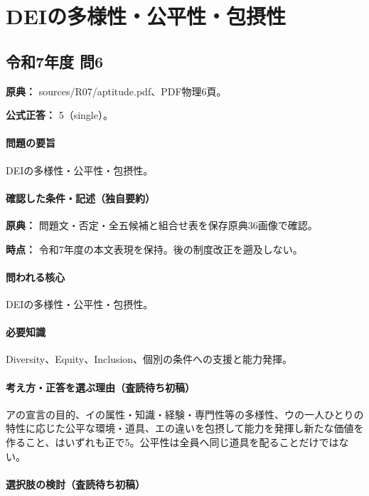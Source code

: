 \section{DEIの多様性・公平性・包摂性}

\subsection{令和7年度 問6}
\label{q:r07-reg-apt-06}

\noindent\textbf{原典：} sources/R07/aptitude.pdf、PDF物理6頁。

\textbf{公式正答：} 5（single）。

\paragraph{問題の要旨} DEIの多様性・公平性・包摂性。

\paragraph{確認した条件・記述（独自要約）}\mbox{}\par

\noindent\textbf{原典：} 問題文・否定・全五候補と組合せ表を保存原典36画像で確認。\par

\noindent\textbf{時点：} 令和7年度の本文表現を保持。後の制度改正を遡及しない。\par

\paragraph{問われる核心} DEIの多様性・公平性・包摂性。

\paragraph{必要知識} Diversity、Equity、Inclusion、個別の条件への支援と能力発揮。

\paragraph{考え方・正答を選ぶ理由（査読待ち初稿）} アの宣言の目的、イの属性・知識・経験・専門性等の多様性、ウの一人ひとりの特性に応じた公平な環境・道具、エの違いを包摂して能力を発揮し新たな価値を作ること、はいずれも正で5。公平性は全員へ同じ道具を配ることだけではない。

\paragraph{選択肢の検討（査読待ち初稿）}\mbox{}\par


